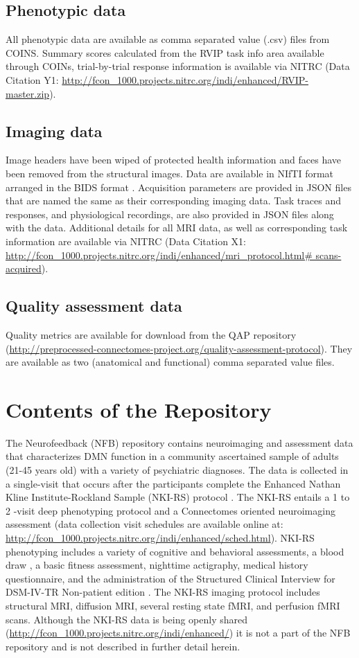 \subsection{Phenotypic data}
All phenotypic data are available as comma separated value (.csv) files from COINS. Summary scores calculated from the RVIP task info area available through COINs, trial-by-trial response information is available via NITRC (Data Citation Y1: \url{http://fcon\_1000.projects.nitrc.org/indi/enhanced/RVIP-master.zip}).

\subsection{Imaging data}
Image headers have been wiped of protected health information and faces have been removed from the structural images. Data are available in NIfTI format arranged in the BIDS format \cite{Gorgolewski2016}. Acquisition parameters are provided in JSON files that are named the same as their corresponding imaging data. Task traces and responses, and physiological recordings, are also provided in JSON files along with the data. Additional details for all MRI data, as well as corresponding task information are available via NITRC (Data Citation X1: \url{http://fcon\_1000.projects.nitrc.org/indi/enhanced/mri\_protocol.html\# scans-acquired}).

\subsection{Quality assessment data}
Quality metrics are available for download from the QAP repository (\url{http://preprocessed-connectomes-project.org/quality-assessment-protocol}). They are available as two (anatomical and functional) comma separated value files.

\section{Contents of the Repository}
The Neurofeedback (NFB) repository contains neuroimaging and assessment data that characterizes DMN function in a community ascertained sample of adults (21-45 years old) with a variety of psychiatric diagnoses. The data is collected in a single-visit that occurs after the participants complete the Enhanced Nathan Kline Institute-Rockland Sample (NKI-RS) protocol \cite{Nooner2012}. The NKI-RS entails a 1 to 2 -visit deep phenotyping protocol \cite{Nooner2012} and a Connectomes oriented neuroimaging assessment (data collection visit schedules are available online at: \url{http://fcon\_1000.projects.nitrc.org/indi/enhanced/sched.html}). NKI-RS phenotyping includes a variety of cognitive and behavioral assessments, a blood draw , a basic fitness assessment, nighttime actigraphy, medical history questionnaire, and the administration of the Structured Clinical Interview for DSM-IV-TR Non-patient edition \cite{First2002}. The NKI-RS imaging protocol includes structural MRI, diffusion MRI, several resting state fMRI, and perfusion fMRI scans. Although the NKI-RS data is being openly shared (\url{http://fcon\_1000.projects.nitrc.org/indi/enhanced/}) it is not a part of the NFB repository and is not described in further detail herein.

